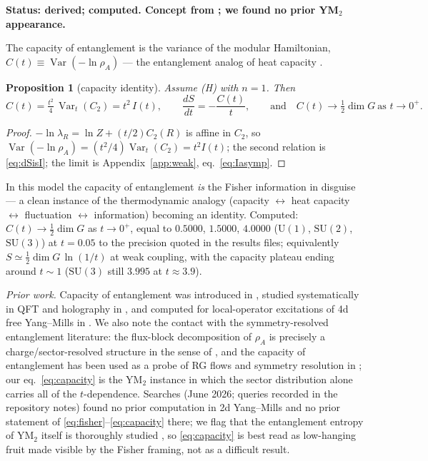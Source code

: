 \documentclass[11pt]{article}
\newtheorem{proposition}[theorem]{Proposition}
\theoremstyle{remark}
\theoremstyle{plain}
\newcommand{\Var}{\operatorname{Var}}
\newcommand{\dG}{\dim G}
\begin{document}
\textbf{Status: derived; computed. Concept from \cite{YQ10, dBJK18}; we found no prior YM$_2$ appearance.}

The capacity of entanglement is the variance of the modular Hamiltonian, $C(t) \equiv \Var(-\ln\rho_A)$ --- the entanglement analog of heat capacity \cite{YQ10, dBJK18}.

\begin{proposition}[capacity identity]\label{prop:capacity}
Assume (H) with $n = 1$. Then
\begin{equation}\label{eq:capacity}
C(t) = \tfrac{t^2}{4}\,\Var_t(C_2) = t^2\, I(t), \qquad \frac{dS}{dt} = -\frac{C(t)}{t}, \qquad \text{and} \quad C(t) \to \tfrac12\dG \ \text{as } t \to 0^+.
\end{equation}
\end{proposition}

\begin{proof}
$-\ln\lambda_R = \ln Z + (t/2)C_2(R)$ is affine in $C_2$, so $\Var(-\ln\rho_A) = (t^2/4)\Var_t(C_2) = t^2 I(t)$; the second relation is \eqref{eq:dSisI}; the limit is Appendix~\ref{app:weak}, eq.~\eqref{eq:Iasymp}.
\end{proof}
In this model the capacity of entanglement \emph{is} the Fisher information in disguise --- a clean instance of the thermodynamic analogy (capacity $\leftrightarrow$ heat capacity $\leftrightarrow$ fluctuation $\leftrightarrow$ information) becoming an identity. Computed: $C(t) \to \tfrac12\dG$ as $t \to 0^+$, equal to $0.5000$, $1.5000$, $4.0000$ ($\mathrm{U}(1)$, $\mathrm{SU}(2)$, $\mathrm{SU}(3)$) at $t = 0.05$ to the precision quoted in the results files; equivalently $S \simeq \tfrac12\dG\,\ln(1/t)$ at weak coupling, with the capacity plateau ending around $t \sim 1$ ($\mathrm{SU}(3)$ still $3.995$ at $t \approx 3.9$).

\emph{Prior work.} Capacity of entanglement was introduced in \cite{YQ10}, studied systematically in QFT and holography in \cite{dBJK18}, and computed for local-operator excitations of 4d free Yang--Mills in \cite{N21}. We also note the contact with the symmetry-resolved entanglement literature: the flux-block decomposition of $\rho_A$ is precisely a charge/sector-resolved structure in the sense of \cite{GS18, XAS18}, and the capacity of entanglement has been used as a probe of RG flows and symmetry resolution in \cite{ADKT23}; our eq.~\eqref{eq:capacity} is the YM$_2$ instance in which the sector distribution alone carries all of the $t$-dependence. Searches (June 2026; queries recorded in the repository notes) found no prior computation in 2d Yang--Mills and no prior statement of \eqref{eq:fisher}--\eqref{eq:capacity} there; we flag that the entanglement entropy of YM$_2$ itself is thoroughly studied \cite{GS14, D14, DTV19, MOPT26}, so \eqref{eq:capacity} is best read as low-hanging fruit made visible by the Fisher framing, not as a difficult result.
\end{document}
